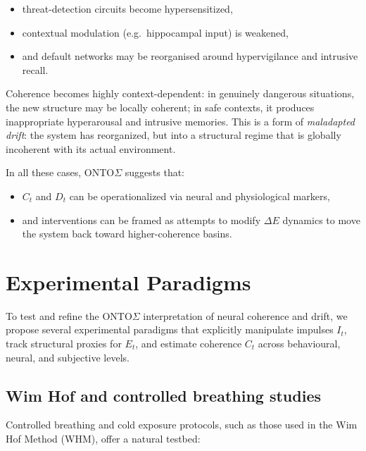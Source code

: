\documentclass[12pt,a4paper]{report}
\begin{document}
\begin{itemize}[leftmargin=2em]
    \item threat-detection circuits become hypersensitized,
    \item contextual modulation (e.g.\ hippocampal input) is weakened,
    \item and default networks may be reorganised around hypervigilance and intrusive recall.
\end{itemize}

Coherence becomes highly context-dependent: in genuinely dangerous situations, the new structure may be locally coherent; in safe contexts, it produces inappropriate hyperarousal and intrusive memories. This is a form of \emph{maladapted drift}: the system has reorganized, but into a structural regime that is globally incoherent with its actual environment.

In all these cases, ONTO$\Sigma$ suggests that:

\begin{itemize}[leftmargin=2em]
    \item \(C_t\) and \(D_t\) can be operationalized via neural and physiological markers,
    \item and interventions can be framed as attempts to modify $\Delta E$ dynamics to move the system back toward higher-coherence basins.
\end{itemize}

\section{Experimental Paradigms}

To test and refine the ONTO$\Sigma$ interpretation of neural coherence and drift, we propose several experimental paradigms that explicitly manipulate impulses \(I_t\), track structural proxies for \(E_t\), and estimate coherence \(C_t\) across behavioural, neural, and subjective levels.

\subsection*{Wim Hof and controlled breathing studies}

Controlled breathing and cold exposure protocols, such as those used in the Wim Hof Method (WHM), offer a natural testbed:
\end{document}
